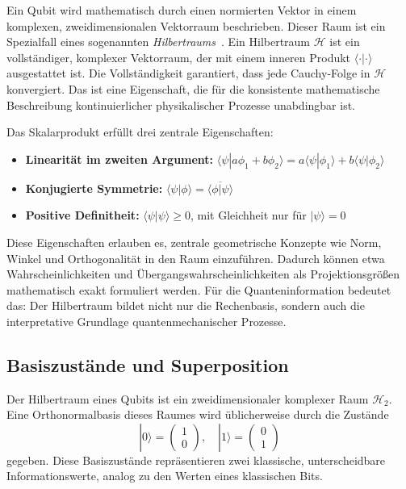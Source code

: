 Ein Qubit wird mathematisch durch einen normierten Vektor in einem komplexen, zweidimensionalen Vektorraum beschrieben. Dieser Raum ist ein Spezialfall eines sogenannten \emph{Hilbertraums}~\cite{nielsen2002quantum, greinerQM}. Ein Hilbertraum $\mathcal{H}$ ist ein vollständiger, komplexer Vektorraum, der mit einem inneren Produkt $\langle \cdot | \cdot \rangle$ ausgestattet ist. Die Vollständigkeit garantiert, dass jede Cauchy-Folge in $\mathcal{H}$ konvergiert. Das ist eine Eigenschaft, die für die konsistente mathematische Beschreibung kontinuierlicher physikalischer Prozesse unabdingbar ist.

Das Skalarprodukt erfüllt drei zentrale Eigenschaften:
\begin{itemize}
    \item \textbf{Linearität im zweiten Argument:} $\langle \psi | a \phi_1 + b \phi_2 \rangle = a \langle \psi | \phi_1 \rangle + b \langle \psi | \phi_2 \rangle$
    \item \textbf{Konjugierte Symmetrie:} $\langle \psi | \phi \rangle = \overline{\langle \phi | \psi \rangle}$
    \item \textbf{Positive Definitheit:} $\langle \psi | \psi \rangle \geq 0$, mit Gleichheit nur für $|\psi\rangle = 0$
\end{itemize}

Diese Eigenschaften erlauben es, zentrale geometrische Konzepte wie Norm, Winkel und Orthogonalität in den Raum einzuführen. Dadurch können etwa Wahrscheinlichkeiten und Übergangswahrscheinlichkeiten als Projektionsgrößen mathematisch exakt formuliert werden. Für die Quanteninformation bedeutet das: Der Hilbertraum bildet nicht nur die Rechenbasis, sondern auch die interpretative Grundlage quantenmechanischer Prozesse.

\subsection*{Basiszustände und Superposition}
Der Hilbertraum eines Qubits ist ein zweidimensionaler komplexer Raum $\mathcal{H}_2$. Eine Orthonormalbasis dieses Raumes wird üblicherweise durch die Zustände
\begin{equation}
|0\rangle = \begin{pmatrix} 1 \\ 0 \end{pmatrix}, \quad |1\rangle = \begin{pmatrix} 0 \\ 1 \end{pmatrix}
\end{equation}
gegeben. Diese Basiszustände repräsentieren zwei klassische, unterscheidbare Informationswerte, analog zu den Werten eines klassischen Bits.

